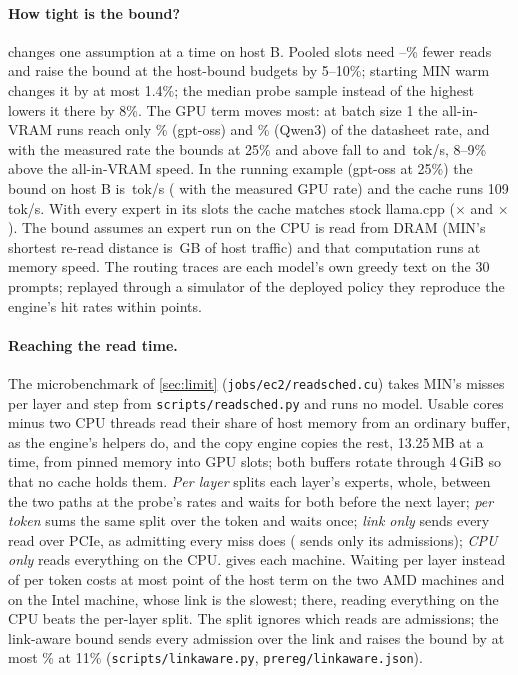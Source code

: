 \paragraph{How tight is the bound?}  changes one assumption at a time on host B. Pooled slots need
\globalReadsMin--\globalReadsMax\% fewer reads and raise the bound at the host-bound budgets by 5--10\%; starting MIN warm changes it by
at most 1.4\%; the median probe sample instead of the highest lowers it there by 8\%. The GPU term moves
most: at batch size 1 the all-in-VRAM runs reach only \gpuEffPctGpt\% (gpt-oss) and \gpuEffPctQwen\% (Qwen3) of the
datasheet rate, and with the measured rate the bounds at 25\% and above fall to \limMeasGpuGpt{} and
\limMeasGpuQwen\,tok/s, 8--9\% above the all-in-VRAM speed. In the running example (gpt-oss at 25\%) the bound on host B
is \limExMidG\,tok/s (\limMeasGpuGpt{} with the measured GPU rate) and the cache runs 109\,tok/s. With every expert in
its slots the cache matches stock llama.cpp (\cOneTwoEight$\times$ and \cOneTwoEightQ$\times$). The bound assumes an
expert run on the CPU is read from DRAM (MIN's shortest re-read distance is \lthreeReuseMin\,GB of host traffic) and
that computation runs at memory speed. The routing traces are each model's own greedy text on the 30 prompts; replayed
through a simulator of the deployed policy they reproduce the engine's hit rates within \simHitQwenMax{} points.





\paragraph{Reaching the read time.} The microbenchmark of \cref{sec:limit} (\texttt{jobs/ec2/readsched.cu}) takes
MIN's misses per layer and step from \texttt{scripts/readsched.py} and runs no model. Usable cores minus two CPU threads
read their share of host memory from an ordinary buffer, as the engine's helpers do, and the copy engine copies the
rest, 13.25\,MB at a time, from pinned memory into GPU slots; both buffers rotate through 4\,GiB so that no cache holds
them. \emph{Per layer} splits each layer's experts, whole, between the two paths at the probe's rates and waits for
both before the next layer; \emph{per token} sums the same split over the token and waits once; \emph{link only} sends
every read over PCIe, as admitting every miss does (\MinOne{} sends only its admissions); \emph{CPU only} reads everything on the CPU. 
gives each machine. Waiting per layer instead of per token costs at most \jdWaitCostAmdMax{} point of the host term on the
two AMD machines and \jdWaitCostMax{} on the Intel machine, whose link is the slowest; there, reading everything on the CPU
beats the per-layer split.
The split ignores which reads are admissions; the link-aware bound sends every
admission over the link and raises the bound by at most \laOverLowMax\% at 11\% (\texttt{scripts/linkaware.py}, \texttt{prereg/linkaware.json}).

